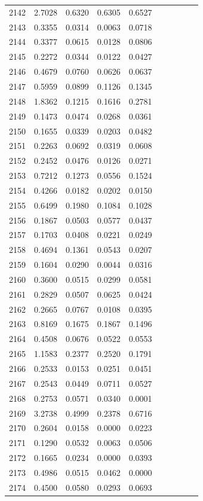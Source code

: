 \begin{table}
\begin{tabular}{cccccccccc}
2142& 2.7028& 0.6320& 0.6305& 0.6527\\ 
2143& 0.3355& 0.0314& 0.0063& 0.0718\\ 
2144& 0.3377& 0.0615& 0.0128& 0.0806\\ 
2145& 0.2272& 0.0344& 0.0122& 0.0427\\ 
2146& 0.4679& 0.0760& 0.0626& 0.0637\\ 
2147& 0.5959& 0.0899& 0.1126& 0.1345\\ 
2148& 1.8362& 0.1215& 0.1616& 0.2781\\ 
2149& 0.1473& 0.0474& 0.0268& 0.0361\\ 
2150& 0.1655& 0.0339& 0.0203& 0.0482\\ 
2151& 0.2263& 0.0692& 0.0319& 0.0608\\ 
2152& 0.2452& 0.0476& 0.0126& 0.0271\\ 
2153& 0.7212& 0.1273& 0.0556& 0.1524\\ 
2154& 0.4266& 0.0182& 0.0202& 0.0150\\ 
2155& 0.6499& 0.1980& 0.1084& 0.1028\\ 
2156& 0.1867& 0.0503& 0.0577& 0.0437\\ 
2157& 0.1703& 0.0408& 0.0221& 0.0249\\ 
2158& 0.4694& 0.1361& 0.0543& 0.0207\\ 
2159& 0.1604& 0.0290& 0.0044& 0.0316\\ 
2160& 0.3600& 0.0515& 0.0299& 0.0581\\ 
2161& 0.2829& 0.0507& 0.0625& 0.0424\\ 
2162& 0.2665& 0.0767& 0.0108& 0.0395\\ 
2163& 0.8169& 0.1675& 0.1867& 0.1496\\ 
2164& 0.4508& 0.0676& 0.0522& 0.0553\\ 
2165& 1.1583& 0.2377& 0.2520& 0.1791\\ 
2166& 0.2533& 0.0153& 0.0251& 0.0451\\ 
2167& 0.2543& 0.0449& 0.0711& 0.0527\\ 
2168& 0.2753& 0.0571& 0.0340& 0.0001\\ 
2169& 3.2738& 0.4999& 0.2378& 0.6716\\ 
2170& 0.2604& 0.0158& 0.0000& 0.0223\\ 
2171& 0.1290& 0.0532& 0.0063& 0.0506\\ 
2172& 0.1665& 0.0234& 0.0000& 0.0393\\ 
2173& 0.4986& 0.0515& 0.0462& 0.0000\\ 
2174& 0.4500& 0.0580& 0.0293& 0.0693\\ 

\end{tabular}
\end{table}

